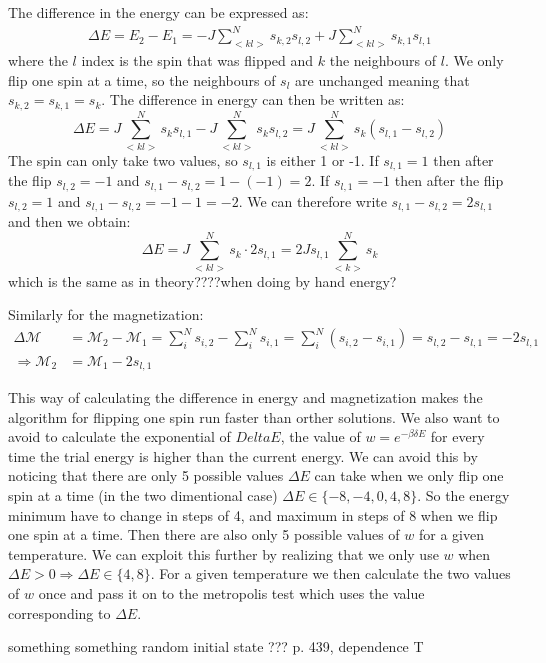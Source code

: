 \documentclass[11pt,a4wide]{article}
\begin{document}
The difference in the energy can be expressed as:
\begin{align*}
\Delta E = E_2 - E_1 = -J\sum_{<kl>}^N s_{k,2}s_{l,2} + J\sum_{<kl>}^N s_{k,1}s_{l,1}
\end{align*}
where the $l$ index is the spin that was flipped and $k$ the neighbours of $l$.  We only flip one spin at a time, so the neighbours of $s_l$ are unchanged meaning that $s_{k,2} = s_{k,1} = s_k$. The difference in energy can then be written as:
\[
\Delta E = J\sum_{<kl>}^N s_ks_{l,1} - J\sum_{<kl>}^N s_ks_{l,2} = J\sum_{<kl>}^N s_k(s_{l,1} - s_{l,2} )
\]
The spin can only take two values, so $s_{l,1}$ is either 1 or -1. If $s_{l,1}=1$ then after the flip $s_{l,2} = -1$ and $s_{l,1} - s_{l,2} = 1 - (-1) = 2$. If $s_{l,1}=-1$ then after the flip $s_{l,2} = 1$ and $s_{l,1} - s_{l,2} = -1 - 1 = -2$. We can therefore write $s_{l,1} - s_{l,2} = 2s_{l,1}$ and then we obtain:
\[
\Delta E = J\sum_{<kl>}^N s_k\cdot 2s_{l,1} = 2Js_{l,1}\sum_{<k>}^N s_k
\]
which is the same as in theory????when doing by hand energy?

Similarly for the magnetization:
\begin{align*}
\Delta \mathcal{M} &= \mathcal{M}_2 - \mathcal{M}_1 = \sum_i^N s_{i,2} - \sum_i^N s_{i,1} = \sum_i^N (s_{i,2} -  s_{i,1}) = s_{l,2} - s_{l,1} = -2s_{l,1}\\
\Rightarrow \mathcal{M}_2 &= \mathcal{M}_1 - 2s_{l,1}
\end{align*}

This way of calculating the difference in energy and magnetization makes the algorithm for flipping one spin run faster than orther solutions. We also want to avoid to calculate the exponential of $Delta E $, the value of $w=e^{-\beta\delta E}$ for every time the trial energy is higher than the current energy. We can avoid this by noticing that there are only 5 possible values $\Delta E$ can take when we only flip one spin at a time (in the two dimentional case) $\Delta E \in \{-8, -4, 0, 4, 8\}$. So the energy minimum have to change in steps of 4, and maximum in steps of 8 when we flip one spin at a time. Then there are also only 5 possible values of $w$ for a given temperature. We can exploit this further by realizing that we only use $w$ when $\Delta E > 0 \Rightarrow \Delta E \in \{4, 8\}$. For a given temperature we then calculate the two values of $w$ once and pass it on to the metropolis test which uses the value corresponding to $\Delta E$. 


something something random initial state ??? p. 439, dependence T
\end{document}
